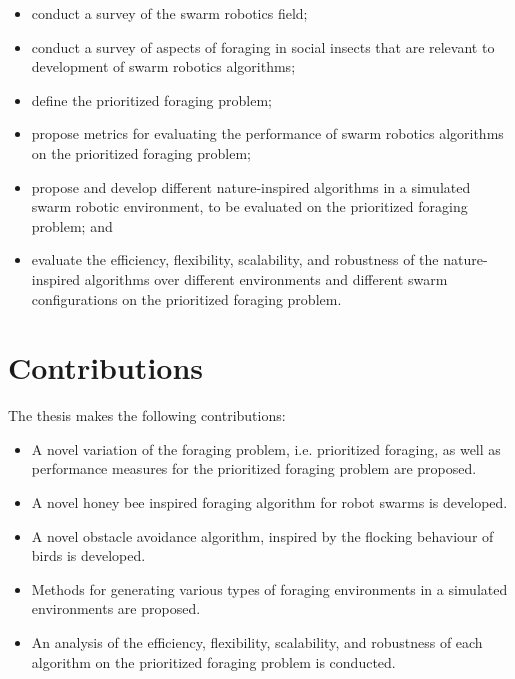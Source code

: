 \begin{itemize}
	\item conduct a survey of the swarm robotics field;
	\item conduct a survey of aspects of foraging in social insects that are relevant to development of swarm robotics algorithms;
	\item define the prioritized foraging problem;
	\item propose metrics for evaluating the performance of swarm robotics algorithms on the prioritized foraging problem;
	\item propose and develop different nature-inspired algorithms in a simulated swarm robotic environment, to be evaluated on the prioritized foraging problem; and
	\item evaluate the efficiency, flexibility, scalability, and robustness of the nature-inspired algorithms over different environments and different swarm configurations on the prioritized foraging problem.
\end{itemize}



\section{Contributions}
\label{sec:introduction:contributions}

The thesis makes the following contributions:

\begin{itemize}
	\item A novel variation of the foraging problem, i.e. prioritized foraging, as well as performance measures for the prioritized foraging problem are proposed.
	\item A novel honey bee inspired foraging algorithm for robot swarms is developed.
	\item A novel obstacle avoidance algorithm, inspired by the flocking behaviour of birds is developed.
	\item Methods for generating various types of foraging environments in a simulated environments are proposed.
	\item An analysis of the efficiency, flexibility, scalability, and robustness of each algorithm on the prioritized foraging problem is conducted.
\end{itemize}



